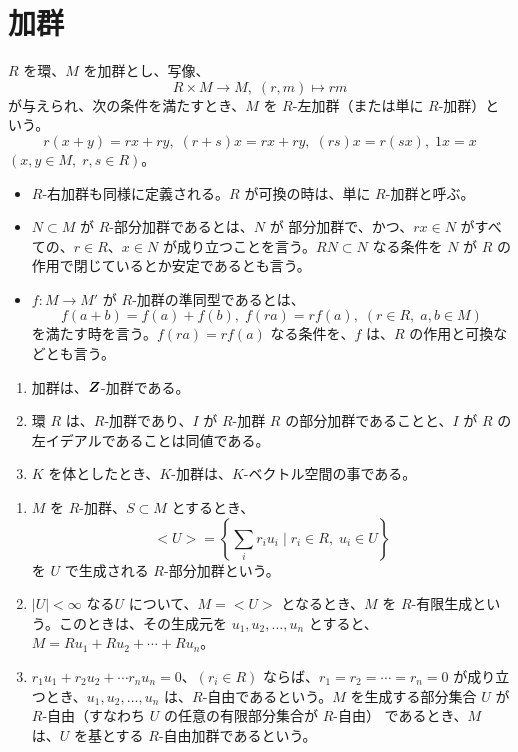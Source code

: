\newpage
\section{加群}
\begin{definition}
$R$ を環、$M$ を加群とし、写像、
$$R\times M \to M,\;(r,m)\mapsto rm$$
が与えられ、次の条件を満たすとき、$M$ を $R$-左加群（または単に $R$-加群）という。
$$r(x+y) = rx+ry, \;(r+s)x = rx+ry,\;(rs)x = r(sx), \;1x = x$$
$(x,y\in M,\;r,s\in R)$。
\end{definition}

\begin{itemize}
\item $R$-右加群も同様に定義される。$R$ が可換の時は、単に $R$-加群と呼ぶ。
\item $N\subset M$ が $R$-部分加群であるとは、$N$ が 部分加群で、かつ、$rx\in N$ がすべての、$r\in R$、$x\in N$ が成り立つことを言う。$RN\subset N$ なる条件を $N$ が $R$ の作用で閉じているとか安定であるとも言う。
\item $f:M\to M'$ が $R$-加群の準同型であるとは、
$$f(a+b) = f(a)+f(b),\;f(ra) = rf(a),\;(r\in R,\;a,b\in M)$$
を満たす時を言う。$f(ra) = rf(a)$ なる条件を、$f$ は、$R$ の作用と可換などとも言う。
\end{itemize}

\begin{eg}
\begin{enumerate}
\item 加群は、$\mbox{\boldmath $Z$}$-加群である。
\item 環 $R$ は、$R$-加群であり、$I$ が $R$-加群 $R$ の部分加群であることと、$I$ が $R$ の左イデアルであることは同値である。
\item $K$ を体としたとき、$K$-加群は、$K$-ベクトル空間の事である。
\end{enumerate}
\end{eg}

\begin{definition}
\begin{enumerate}
\item $M$ を $R$-加群、$S\subset M$ とするとき、
$$<U> = \left\{\sum_{i}r_iu_i\mid r_i\in R, \;u_i\in U\right\}$$
を $U$ で生成される $R$-部分加群という。
\item $|U|<\infty$ なる$U$ について、$M = <U>$ となるとき、$M$ を $R$-有限生成という。このときは、その生成元を $u_1, u_2, \ldots, u_n$ とすると、$M = Ru_1 + Ru_2 + \cdots + Ru_n$。
\item $r_1u_1 + r_2u_2 + \cdots r_nu_n = 0$、$(r_i\in R)$ ならば、$r_1 = r_2 = \cdots= r_n = 0$ が成り立つとき、$u_1, u_2, \ldots, u_n$ は、$R$-自由であるという。$M$ を生成する部分集合 $U$ が $R$-自由（すなわち $U$ の任意の有限部分集合が $R$-自由）
であるとき、$M$ は、$U$ を基とする $R$-自由加群であるという。
\end{enumerate}
\end{definition}


